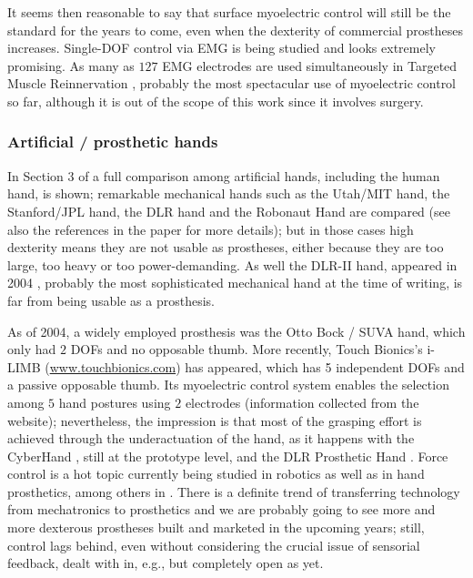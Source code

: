 It seems then reasonable to say that surface myoelectric control will still be the
standard for the years to come, even when the dexterity of commercial prostheses
increases. Single-DOF control via EMG is being studied \cite{englehart08} and looks
extremely promising. As many as $127$ EMG electrodes are used simultaneously in Targeted
Muscle Reinnervation \cite{kuiken06}, probably the most spectacular use of myoelectric control
so far, although it is out of the scope of this work since it involves surgery.

\subsubsection{Artificial / prosthetic hands}

In Section $3$ of \cite{zecca02} a full comparison among artificial hands, including
the human hand, is shown; remarkable mechanical hands such as the Utah/MIT hand, the
Stanford/JPL hand, the DLR hand and the Robonaut Hand are compared (see also the
references in the paper for more details); but in those cases high dexterity means they
are not usable as prostheses, either because they are too large, too heavy or too power-demanding.
As well the DLR-II hand, appeared in 2004 \cite{ButFisGre2004}, probably the most sophisticated
mechanical hand at the time of writing, is far from being usable as a prosthesis.

As of 2004, a widely employed prosthesis was the Otto Bock / SUVA hand, which only had $2$ DOFs and
no opposable thumb. More recently, Touch Bionics's i-LIMB (\url{www.touchbionics.com}) has appeared, which has
5 independent DOFs and a passive opposable thumb. Its myoelectric control system enables
the selection among $5$ hand postures using $2$ electrodes (information collected from the
website); nevertheless, the impression is that most of the grasping effort is achieved through
the underactuation of the hand, as it happens with the CyberHand \cite{cyberhand}, still at
the prototype level, and the DLR Prosthetic Hand \cite{Hua2006}. Force control is a hot topic
currently being studied in robotics \cite{ott,thomas} as well as in hand prosthetics, among others
in \cite{meek1,meek2}. There is a definite trend of transferring technology from
mechatronics to prosthetics and we are probably going to see more and more dexterous
prostheses built and marketed in the upcoming years; still, control
lags behind, even without considering the crucial issue of sensorial feedback,
dealt with in, e.g., \cite{cipriani} but completely open as yet.

